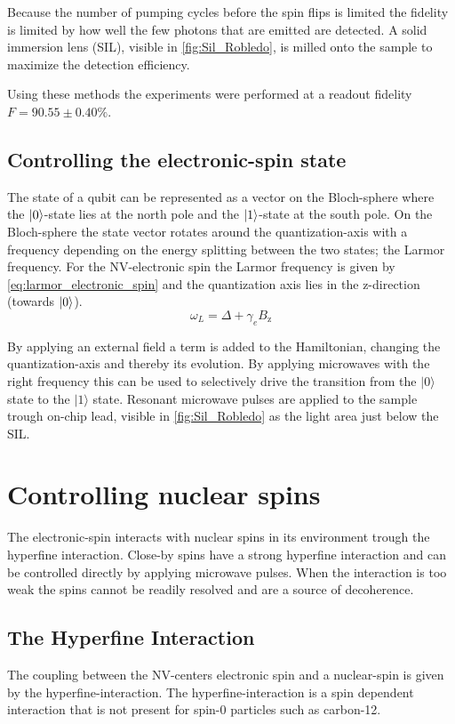 Because the number of pumping cycles before the spin flips is limited the fidelity is limited by how well the few photons that are emitted are detected.
A solid immersion lens (SIL), visible in \cref{fig:Sil_Robledo}, is milled onto the sample to maximize the detection efficiency.

Using these methods the experiments were performed at a readout fidelity $F= 90.55 \pm 0.40 \%$.

\subsection{Controlling the electronic-spin state}
The state of a qubit can be represented as a vector on the Bloch-sphere where the ${\left\vert{0}\right\rangle}$-state lies at the north pole and the ${\left\vert{1}\right\rangle}$-state at the south pole.
On the Bloch-sphere the state vector rotates around the quantization-axis with a frequency depending on the energy splitting between the two states; the Larmor frequency.
For the NV-electronic spin the Larmor frequency is given by \cref{eq:larmor_electronic_spin} and the quantization axis lies in the z-direction (towards ${\left\vert{0}\right\rangle}$).
\begin{equation}
    \omega_L =\Delta + \gamma_e {B_\mathrm{z}}
    \label{eq:larmor_electronic_spin}
\end{equation}

By applying an external field a term is added to the Hamiltonian, changing the quantization-axis and thereby its evolution.
By applying microwaves with the right frequency this can be used to selectively drive the transition from the  $|0\rangle$ state to the $|1\rangle$ state\citep{Jelezko2004Observation}.
Resonant microwave pulses are applied to the sample trough on-chip lead, visible in \cref{fig:Sil_Robledo} as the light area just below the SIL.

\section{Controlling nuclear spins}
The electronic-spin interacts with nuclear spins in its environment trough the hyperfine interaction.
Close-by spins have a strong hyperfine interaction and can be controlled directly by applying microwave pulses.
When the interaction is too weak the spins cannot be readily resolved and are a source of decoherence.

\subsection{The Hyperfine Interaction}
The coupling between the NV-centers electronic spin and a nuclear-spin is given by the hyperfine-interaction.
The hyperfine-interaction is a spin dependent interaction that is not present for spin-0 particles such as carbon-12.

